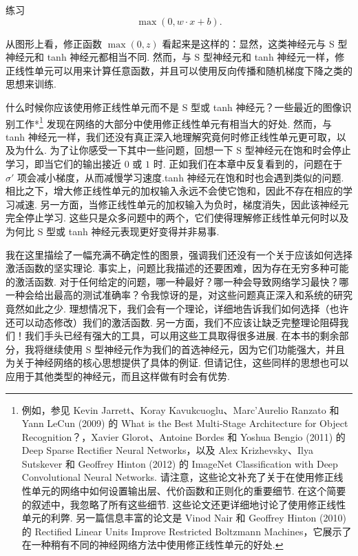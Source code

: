 \begin{exerciseBox}{练习}
\begin{equation}
\max(0, w \cdot x+b).
\tag{112}
\end{equation}

\noindent 从图形上看，修正函数 $\max(0, z)$ 看起来是这样的：显然，这类神经元与 S 型神经元和 tanh 神经元都相当不同. 然而，与 S 型神经元和 tanh 神经元一样，修正线性单元\label{term:60}可以用来计算任意函数，并且可以使用反向传播和随机梯度下降之类的思想来训练.

什么时候你应该使用修正线性单元而不是 S 型或 tanh 神经元？一些最近的图像识别工作*\footnote{例如，参见 Kevin Jarrett、Koray Kavukcuoglu、Marc'Aurelio Ranzato 和 Yann LeCun (2009) 的 What is the Best Multi-Stage Architecture for Object Recognition？，Xavier Glorot、Antoine Bordes 和 Yoshua Bengio (2011) 的 Deep Sparse Rectiﬁer Neural Networks，以及 Alex Krizhevsky、Ilya Sutskever 和 Geoffrey Hinton (2012) 的 ImageNet Classification with Deep Convolutional Neural Networks. 请注意，这些论文补充了关于在使用修正线性单元的网络中如何设置输出层、代价函数和正则化的重要细节. 在这个简要的叙述中，我忽略了所有这些细节. 这些论文还更详细地讨论了使用修正线性单元的利弊. 另一篇信息丰富的论文是 Vinod Nair 和 Geoffrey Hinton (2010) 的 Rectified Linear Units Improve Restricted Boltzmann Machines，它展示了在一种稍有不同的神经网络方法中使用修正线性单元的好处.} 发现在网络的大部分中使用修正线性单元有相当大的好处. 然而，与 tanh 神经元一样，我们还没有真正深入地理解究竟何时修正线性单元更可取，以及为什么. 为了让你感受一下其中一些问题，回想一下 S 型神经元在饱和时会停止学习，即当它们的输出接近 $0$ 或 $1$ 时. 正如我们在本章中反复看到的，问题在于 $\sigma'$ 项会减小梯度，从而减慢学习速度.tanh 神经元在饱和时也会遇到类似的问题. 相比之下，增大修正线性单元的加权输入永远不会使它饱和，因此不存在相应的学习减速. 另一方面，当修正线性单元的加权输入为负时，梯度消失，因此该神经元完全停止学习. 这些只是众多问题中的两个，它们使得理解修正线性单元何时以及为何比 S 型或 tanh 神经元表现更好变得并非易事.

我在这里描绘了一幅充满不确定性的图景，强调我们还没有一个关于应该如何选择激活函数的坚实理论. 事实上，问题比我描述的还要困难，因为存在无穷多种可能的激活函数. 对于任何给定的问题，哪一种最好？哪一种会导致网络学习最快？哪一种会给出最高的测试准确率？令我惊讶的是，对这些问题真正深入和系统的研究竟然如此之少. 理想情况下，我们会有一个理论，详细地告诉我们如何选择（也许还可以动态修改）我们的激活函数. 另一方面，我们不应该让缺乏完整理论阻碍我们！我们手头已经有强大的工具，可以用这些工具取得很多进展. 在本书的剩余部分，我将继续使用 S 型神经元作为我们的首选神经元，因为它们功能强大，并且为关于神经网络的核心思想提供了具体的例证. 但请记住，这些同样的思想也可以应用于其他类型的神经元，而且这样做有时会有优势.

\end{exerciseBox}

